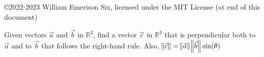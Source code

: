 \documentclass[12pt]{article}
\newcommand{\R}{\mathbb{R}}
\newenvironment{problem}[2][Problem]{\begin{trivlist}
\item[\hskip \labelsep {\bfseries #1}\hskip \labelsep {\bfseries #2.}]}{\end{trivlist}}
\begin{document}

\rhead{\today}


\copyright 2022-2023 William Emerison Six, licensed under the MIT License (at end of this document)

\begin{problem}{1} %

  Given vectors $\vec{a}$ and $\vec{b}$ in $\R^3$, find a vector $\vec{c}$ in $\R^3$ that is perpendicular both to $\vec{a}$ and to $\vec{b}$
  that follows the right-hand rule.  Also, $\norm{\vec{c}} = \norm{\vec{a}}\norm{\vec{b}}\sin(\theta) $
\end{problem}
\end{document}
